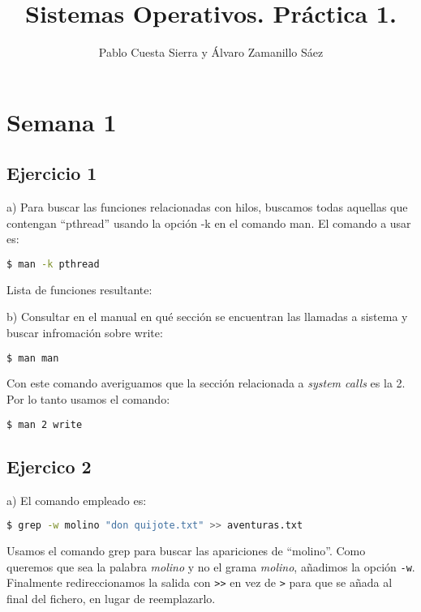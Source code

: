 \documentclass{article}
\title{Sistemas Operativos. Práctica 1.}
\author{Pablo Cuesta Sierra y Álvaro Zamanillo Sáez }
\date{}
\begin{document}
\maketitle


\section*{Semana 1}

\subsection*{Ejercicio 1}

a) Para buscar las funciones relacionadas con hilos, buscamos todas aquellas que contengan ``pthread'' usando la opción -k en el comando man. El comando a usar es: 

\begin{lstlisting}[language=bash]
$ man -k pthread
\end{lstlisting}

Lista de funciones resultante: 



b) Consultar en el manual en qué sección se encuentran las llamadas a sistema y buscar infromación sobre write:

\begin{lstlisting}[language=bash]
$ man man
\end{lstlisting}

Con este comando averiguamos que la sección relacionada a \textit{system calls} es la 2. Por lo tanto usamos el comando:

\begin{lstlisting}[language=bash]
$ man 2 write
\end{lstlisting}

\subsection*{Ejercico 2}


a) El comando empleado es: 

\begin{lstlisting}[language=bash]
$ grep -w molino "don quijote.txt" >> aventuras.txt
\end{lstlisting}

Usamos el comando grep para buscar las apariciones de ``molino''. Como queremos que sea la palabra \textit{molino} y no el grama \textit{molino}, añadimos la opción \texttt{-w}. Finalmente redireccionamos la salida con \texttt {>}\texttt {>} en vez de \texttt {>} para que se añada al final del fichero, en lugar de reemplazarlo.
\end{document}
